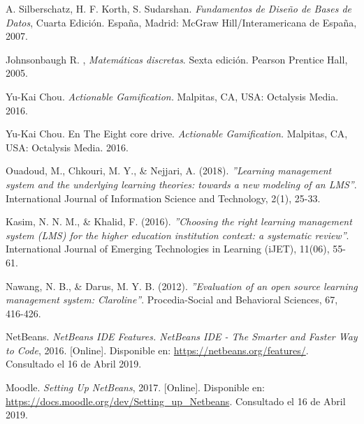 \begin{thebibliography}{9}
        A. Silberschatz, H. F. Korth, S. Sudarshan. \textit{Fundamentos de Diseño de Bases de Datos}, Cuarta Edición. España, Madrid: McGraw Hill/Interamericana de España,  2007.
        
        Johnsonbaugh R. , \textit{Matemáticas discretas}. Sexta edición. Pearson Prentice Hall, 2005.
        
        Yu-Kai Chou.
        \textit{Actionable Gamification.}
        Malpitas, CA, USA: Octalysis Media. 2016. 
    
    
        Yu-Kai Chou.
        En The Eight core drive.
        \textit{Actionable Gamification.}
        Malpitas, CA, USA: Octalysis Media. 2016. 
    
        Ouadoud, M., Chkouri, M. Y., \& Nejjari, A. (2018). {\it''Learning management system and the underlying learning theories: towards a new modeling of an LMS''}. International Journal of Information Science and Technology, 2(1), 25-33.
        
        Kasim, N. N. M., \& Khalid, F. (2016). {\it''Choosing the right learning management system (LMS) for the higher education institution context: a systematic review''}. International Journal of Emerging Technologies in Learning (iJET), 11(06), 55-61.
    
        Nawang, N. B., \& Darus, M. Y. B. (2012). {\it''Evaluation of an open source learning management system: Claroline''}. Procedia-Social and Behavioral Sciences, 67, 416-426.

    
    
    
        NetBeans. {\it NetBeans IDE Features. NetBeans IDE - The Smarter and Faster Way to Code}, 2016. [Online]. Disponible en: \url{https://netbeans.org/features/}. Consultado el 16 de Abril 2019.
    
        Moodle. {\it Setting Up NetBeans}, 2017. [Online]. Disponible en: \url{https://docs.moodle.org/dev/Setting_up_Netbeans}. Consultado el 16 de Abril 2019.
    

\end{thebibliography}
